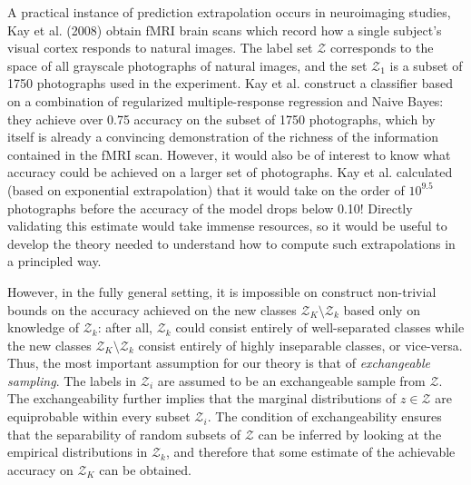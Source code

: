 \documentclass{article}
\begin{document}
A practical instance of prediction extrapolation occurs in neuroimaging studies,
Kay et al. (2008) obtain fMRI brain scans which record how a single subject's visual cortex responds to natural images.
The label set $\mathcal{Z}$ corresponds to the space of all grayscale photographs of natural images,
and the set $\mathcal{Z}_1$ is a subset of 1750 photographs used in the experiment.
Kay et al. construct a classifier based on a combination of regularized multiple-response regression
and Naive Bayes: they achieve over 0.75 accuracy on the subset of 1750 photographs,
which by itself is already a convincing demonstration of the richness of the information contained in the fMRI scan.
However, it would also be of interest to know what accuracy could be achieved on a larger set of photographs.
Kay et al. calculated (based on exponential extrapolation) that it would take on the order of $10^{9.5}$ photographs
before the accuracy of the model drops below 0.10!  Directly validating this estimate would take immense resources,
so it would be useful to develop the theory needed to understand how to compute such extrapolations
in a principled way. 

However, in the fully general setting, it is impossible on construct
non-trivial bounds on the accuracy achieved on the new classes $\mathcal{Z}_K \setminus \mathcal{Z}_k$
based only on knowledge of $\mathcal{Z}_k$: after all, $\mathcal{Z}_k$ could consist entirely of well-separated classes
while the new classes $\mathcal{Z}_K \setminus \mathcal{Z}_k$ consist entirely of highly inseparable classes, or vice-versa.
Thus, the most important assumption for our theory is that of \emph{exchangeable sampling}.
The labels in $\mathcal{Z}_i$ are assumed to be an exchangeable sample from $\mathcal{Z}$.
The exchangeability further implies that the marginal distributions of $z \in \mathcal{Z}$ 
are equiprobable within every subset $\mathcal{Z}_i$. 
The condition of exchangeability ensures that the separability of random subsets of $\mathcal{Z}$ can be inferred
by looking at the empirical distributions in $\mathcal{Z}_k$, and therefore that some estimate of the achievable
accuracy on $\mathcal{Z}_K$ can be obtained.
\end{document}
